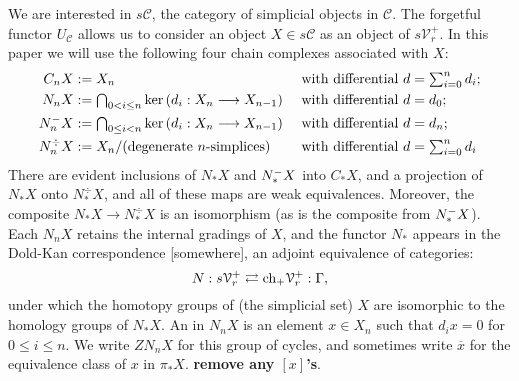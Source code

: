 \documentclass[11pt]{amsart}
\theoremstyle{plain}
\theoremstyle{definition}
\renewcommand{\ker}{\textup{ker}\,}
\renewcommand{\to}{\longrightarrow}
\newcommand{\calC}{\mathcal{C}}
\newcommand{\calV}{\mathcal{V}}
\theoremstyle{plain}
\newcommand{\vect}[2]{\calV^{#1}_{#2}}
\newcommand{\Nop}{N^{\smash{-}}}
\begin{document}
\begin{Conventions and notation}
We are interested in $s\calC$, the category of simplicial objects in $\calC$. The forgetful functor $U_\calC$ allows us to consider an object $X\in s\calC$ as an object of $s\vect{+}{r}$. In this paper we will use the following four chain complexes associated with $X$:
\begin{alignat*}{2}
C_nX&:=X_n&& \textup{ with differential }d=\textstyle\sum_{i=0}^{n}d_i;\\
N_nX&:=\textstyle\bigcap_{0< i\leq n}\ker(d_i:X_n\to X_{n-1})&& \textup{ with differential }d=d_0;\\
\Nop_nX&:=\textstyle\bigcap_{0\leq i< n}\ker(d_i:X_n\to X_{n-1})&& \textup{ with differential }d=d_n;\\
N_n^\div X&:=X_n/(\textup{degenerate $n$-simplices})&& \textup{ with differential }d=\textstyle\sum_{i=0}^{n}d_i
\end{alignat*}
There are evident inclusions of $N_*X$ and $\Nop_*X$ into $C_*X$, and a projection of $N_*X$ onto $N_*^\div X$, and all of these maps are weak equivalences. Moreover, the composite $N_*X\to N_*^\div X$ is an isomorphism (as is the composite from $\Nop_*X$). Each $N_nX$ retains the internal gradings of $X$, and the functor $N_*$ appears in the Dold-Kan correspondence [somewhere], an adjoint equivalence of categories:
\[N:s\vect{+}{r}\rightleftarrows \textup{ch}_+ \vect{+}{r}:\Gamma,\]
under which the homotopy groups of (the simplicial set) $X$ are isomorphic to the homology groups of $N_*X$.
%
An in $N_nX$ is an element $x\in X_n$ such that $d_ix=0$ for $0\leq i\leq n$. We write $ZN_nX$ for this group of cycles, and sometimes write $\overline{x}$ for the equivalence class of $x$ in $\pi_*X$. \textbf{remove any $[x]$'s}.


\end{Conventions and notation}
\end{document}
